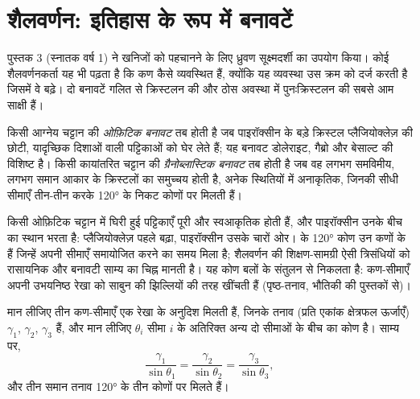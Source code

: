 \section{शैलवर्णन: इतिहास के रूप में बनावटें}\label{sec:b2:field-lab-methods-2:petrography}

पुस्तक 3 (स्नातक वर्ष 1) ने खनिजों को पहचानने के लिए ध्रुवण सूक्ष्मदर्शी का उपयोग किया। कोई शैलवर्णनकर्ता यह भी पढ़ता है
कि कण कैसे व्यवस्थित हैं, क्योंकि यह व्यवस्था उस क्रम को दर्ज करती है जिसमें वे बढ़े। दो
बनावटें गलित से क्रिस्टलन की और ठोस अवस्था में पुनःक्रिस्टलन की सबसे आम
साक्षी हैं।

\begin{definition}[ओफ़िटिक बनावट, ग्रैनोब्लास्टिक बनावट]\label{def:b2:field-lab-methods-2:textures}
किसी आग्नेय चट्टान की \emph{ओफ़िटिक बनावट} तब होती है जब पाइरॉक्सीन के बड़े क्रिस्टल
प्लैजियोक्लेज़ की छोटी, यादृच्छिक दिशाओं वाली पट्टिकाओं को घेर लेते हैं; यह बनावट डोलेराइट, गैब्रो
और बेसाल्ट की विशिष्ट है। किसी कायांतरित चट्टान की \emph{ग्रैनोब्लास्टिक बनावट} तब होती है जब
वह लगभग समविमीय, लगभग समान आकार के क्रिस्टलों का समुच्चय होती है, अनेक स्थितियों में अनाकृतिक,
जिनकी सीधी सीमाएँ तीन-तीन करके \ang{120} के निकट कोणों पर मिलती हैं।
\end{definition}

किसी ओफ़िटिक चट्टान में घिरी हुई पट्टिकाएँ पूरी और स्वआकृतिक होती हैं, और पाइरॉक्सीन उनके बीच का स्थान
भरता है: प्लैजियोक्लेज़ पहले बढ़ा, पाइरॉक्सीन उसके चारों ओर।  के \ang{120} कोण
उन कणों के हैं जिन्हें अपनी सीमाएँ समायोजित करने का समय मिला है; शैलवर्णन की शिक्षण-सामग्री ऐसी त्रिसंधियों
को रासायनिक और बनावटी साम्य का चिह्न मानती है। यह कोण बलों के संतुलन से निकलता है: कण-सीमाएँ अपनी
उभयनिष्ठ रेखा को साबुन की झिल्लियों की तरह खींचती हैं (पृष्ठ-तनाव, भौतिकी की पुस्तकों से)।

\begin{proposition}[किसी त्रिसंधि पर कोण]\label{prop:b2:field-lab-methods-2:triple}
मान लीजिए तीन कण-सीमाएँ एक रेखा के अनुदिश मिलती हैं, जिनके तनाव (प्रति एकांक क्षेत्रफल ऊर्जाएँ) $\gamma_1$,
$\gamma_2$, $\gamma_3$ हैं, और मान लीजिए $\theta_i$ सीमा $i$ के अतिरिक्त अन्य दो सीमाओं के बीच का
कोण है। साम्य पर,
\begin{equation}
\frac{\gamma_1}{\sin\theta_1} = \frac{\gamma_2}{\sin\theta_2} = \frac{\gamma_3}{\sin\theta_3},
\label{eq:b2:field-lab-methods-2:lami}
\end{equation}
और तीन समान तनाव \ang{120} के तीन कोणों पर मिलते हैं।
\end{proposition}

